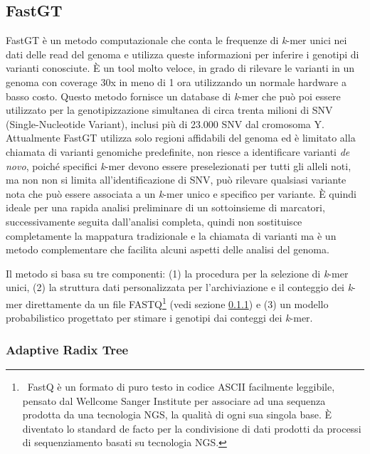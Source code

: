\documentclass[../main.tex]{subfiles}
\begin{document}
\subsection{FastGT}
\label{fastgt}

FastGT \cite{pajuste2017fastgt} è un metodo computazionale che conta le frequenze di \textit{k}-mer unici nei dati delle read del genoma e utilizza queste informazioni per inferire i genotipi di varianti conosciute. È un tool molto veloce, in grado di rilevare le varianti in un genoma con coverage 30x in meno di 1 ora utilizzando un normale hardware a basso costo. Questo metodo fornisce un database di \textit{k}-mer che può poi essere utilizzato per la genotipizzazione simultanea di circa trenta milioni di SNV (Single-Nucleotide Variant), inclusi più di 23.000 SNV dal cromosoma Y. Attualmente FastGT utilizza solo regioni affidabili del genoma ed è limitato alla chiamata di varianti genomiche predefinite, non riesce a identificare varianti \textit{de novo}, poiché specifici \textit{k}-mer devono essere preselezionati per tutti gli alleli noti, ma non non si limita all'identificazione di SNV, può rilevare qualsiasi variante nota che può essere associata a un \textit{k}-mer unico e specifico per variante. È quindi ideale per una rapida analisi preliminare di un sottoinsieme di marcatori, successivamente seguita dall'analisi completa, quindi non sostituisce completamente la mappatura tradizionale e la chiamata di varianti ma è un metodo complementare che facilita alcuni aspetti delle analisi del genoma.

Il metodo si basa su tre componenti: (1) la procedura per la selezione di \textit{k}-mer unici, (2) la struttura dati personalizzata per l'archiviazione e il conteggio dei \textit{k}-mer direttamente da un file FASTQ\footnote{\ FastQ è un formato di puro testo in codice ASCII facilmente leggibile, pensato dal Wellcome Sanger Institute per associare ad una sequenza prodotta da una tecnologia NGS, la qualità di ogni sua singola base. È diventato lo standard de facto per la condivisione di dati \cite{cock2010sanger} \label{nota:FASTQ} prodotti da processi di sequenziamento basati su tecnologia NGS.} (vedi sezione \ref{AdaptiveRadixTree}) e (3) un modello probabilistico progettato per stimare i genotipi dai conteggi dei \textit{k}-mer.

\subsubsection{Adaptive Radix Tree}
\label{AdaptiveRadixTree}
\end{document}
